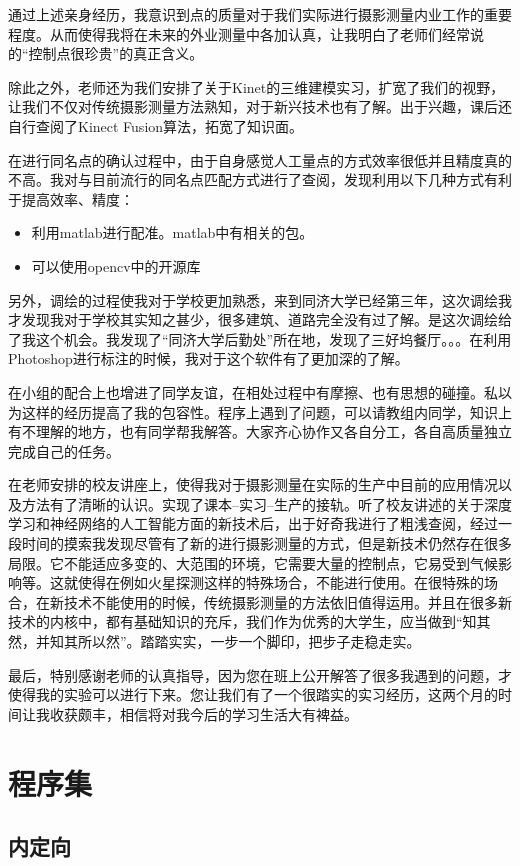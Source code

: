 通过上述亲身经历，我意识到点的质量对于我们实际进行摄影测量内业工作的重要程度。从而使得我将在未来的外业测量中各加认真，让我明白了老师们经常说的“控制点很珍贵”的真正含义。

除此之外，老师还为我们安排了关于Kinet的三维建模实习，扩宽了我们的视野，让我们不仅对传统摄影测量方法熟知，对于新兴技术也有了解。出于兴趣，课后还自行查阅了Kinect Fusion算法，拓宽了知识面。

在进行同名点的确认过程中，由于自身感觉人工量点的方式效率很低并且精度真的不高。我对与目前流行的同名点匹配方式进行了查阅，发现利用以下几种方式有利于提高效率、精度：
\begin{itemize}
\item 利用matlab进行配准。matlab中有相关的包。
\item 可以使用opencv中的开源库
\end{itemize}

另外，调绘的过程使我对于学校更加熟悉，来到同济大学已经第三年，这次调绘我才发现我对于学校其实知之甚少，很多建筑、道路完全没有过了解。是这次调绘给了我这个机会。我发现了“同济大学后勤处”所在地，发现了三好坞餐厅。。。在利用Photoshop进行标注的时候，我对于这个软件有了更加深的了解。

在小组的配合上也增进了同学友谊，在相处过程中有摩擦、也有思想的碰撞。私以为这样的经历提高了我的包容性。程序上遇到了问题，可以请教组内同学，知识上有不理解的地方，也有同学帮我解答。大家齐心协作又各自分工，各自高质量独立完成自己的任务。

在老师安排的校友讲座上，使得我对于摄影测量在实际的生产中目前的应用情况以及方法有了清晰的认识。实现了课本--实习--生产的接轨。听了校友讲述的关于深度学习和神经网络的人工智能方面的新技术后，出于好奇我进行了粗浅查阅，经过一段时间的摸索我发现尽管有了新的进行摄影测量的方式，但是新技术仍然存在很多局限。它不能适应多变的、大范围的环境，它需要大量的控制点，它易受到气候影响等。这就使得在例如火星探测这样的特殊场合，不能进行使用。在很特殊的场合，在新技术不能使用的时候，传统摄影测量的方法依旧值得运用。并且在很多新技术的内核中，都有基础知识的充斥，我们作为优秀的大学生，应当做到“知其然，并知其所以然”。踏踏实实，一步一个脚印，把步子走稳走实。

最后，特别感谢老师的认真指导，因为您在班上公开解答了很多我遇到的问题，才使得我的实验可以进行下来。您让我们有了一个很踏实的实习经历，这两个月的时间让我收获颇丰，相信将对我今后的学习生活大有裨益。

\section{程序集}
\subsection{内定向}

